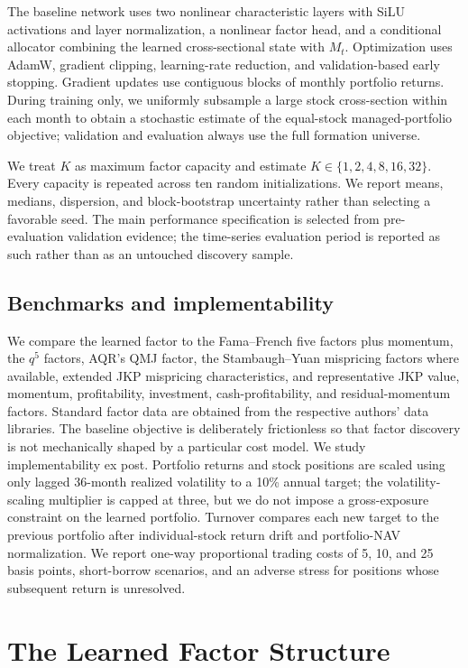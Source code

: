 \documentclass[12pt]{article}
\begin{document}
The baseline network uses two nonlinear characteristic layers with SiLU activations and layer normalization, a nonlinear factor head, and a conditional allocator combining the learned cross-sectional state with $M_t$. Optimization uses AdamW, gradient clipping, learning-rate reduction, and validation-based early stopping. Gradient updates use contiguous blocks of monthly portfolio returns. During training only, we uniformly subsample a large stock cross-section within each month to obtain a stochastic estimate of the equal-stock managed-portfolio objective; validation and evaluation always use the full formation universe.

We treat $K$ as maximum factor capacity and estimate $K\in\{1,2,4,8,16,32\}$. Every capacity is repeated across ten random initializations. We report means, medians, dispersion, and block-bootstrap uncertainty rather than selecting a favorable seed. The main performance specification is selected from pre-evaluation validation evidence; the time-series evaluation period is reported as such rather than as an untouched discovery sample.

\subsection{Benchmarks and implementability}
We compare the learned factor to the Fama--French five factors plus momentum, the $q^5$ factors, AQR's QMJ factor, the Stambaugh--Yuan mispricing factors where available, extended JKP mispricing characteristics, and representative JKP value, momentum, profitability, investment, cash-profitability, and residual-momentum factors. Standard factor data are obtained from the respective authors' data libraries.
The baseline objective is deliberately frictionless so that factor discovery is not mechanically shaped by a particular cost model. We study implementability ex post. Portfolio returns and stock positions are scaled using only lagged 36-month realized volatility to a 10\% annual target; the volatility-scaling multiplier is capped at three, but we do not impose a gross-exposure constraint on the learned portfolio. Turnover compares each new target to the previous portfolio after individual-stock return drift and portfolio-NAV normalization. We report one-way proportional trading costs of 5, 10, and 25 basis points, short-borrow scenarios, and an adverse stress for positions whose subsequent return is unresolved.

\section{The Learned Factor Structure}\label{sec:results}
\end{document}
